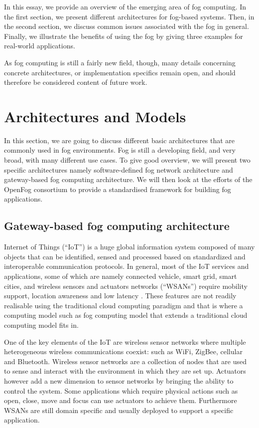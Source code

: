 \documentclass{article}
\begin{document}
In this essay, we provide an overview of the emerging area of fog computing. In the first section, we present different architectures for fog-based systems. Then, in the second section, we discuss common issues associated with the fog in general. Finally, we illustrate the benefits of using the fog by giving three examples for real-world applications.

As fog computing is still a fairly new field, though, many details concerning concrete architectures, or implementation specifics remain open, and should therefore be considered content of future work.

\pagebreak
\section{Architectures and Models}

In this section, we are going to discuss different basic architectures that are commonly used in fog environments. Fog is still a developing field, and very broad, with many different use cases. To give good overview, we will present two specific architectures namely software-defined fog network architecture and gateway-based fog computing architecture.
We will then look at the efforts of the OpenFog consortium to provide a standardised framework for building fog applications.

\subsection{Gateway-based fog computing architecture}

Internet of Things (``IoT'') is a huge global information system composed of many objects that can be identified, sensed and processed based on standardized and interoperable communication protocols\cite{lee2016gateway}.
In general, most of the IoT services and applications, some of which are namely connected vehicle, smart grid, smart cities, and wireless sensors and actuators networks (``WSANs'') require mobility support, location awareness and low latency \cite{lee2016gateway}. 
These features are not readily realisable using the traditional cloud computing paradigm and that is where a computing model such as fog computing model that extends a traditional cloud computing model fits in.

One of the key elements of the IoT are wireless sensor networks where multiple heterogeneous wireless communications coexist: such as WiFi, ZigBee, cellular and Bluetooth. 
Wireless sensor networks are a collection of nodes that are used to sense and interact with the environment in which they are set up. Actuators however add a new dimension to sensor networks by bringing the ability to control the system. Some applications which require physical actions such as open, close, move and focus can use actuators to achieve them. Furthermore WSANs are still domain specific and usually deployed to support a specific application\cite{lee2016gateway}.   
\end{document}
